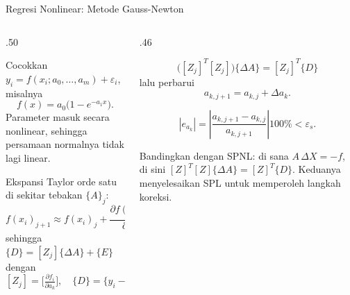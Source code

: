 \documentclass[aspectratio=169,10pt]{beamer}
\begin{document}
\begin{frame}{Regresi Nonlinear: Metode Gauss-Newton}
\tiny
\begin{columns}[T,totalwidth=\textwidth]
\begin{column}{.50\textwidth}
\begin{bluebox}[Masalah]
Cocokkan $y_i=f(x_i;a_0,\dots,a_m)+\varepsilon_i$, misalnya
\[
f(x)=a_0\big(1-e^{-a_1x}\big).
\]
Parameter masuk secara nonlinear, sehingga persamaan normalnya tidak lagi linear.
\end{bluebox}
\begin{orangebox}
Ekspansi Taylor orde satu di sekitar tebakan $\{A\}_j$:
\[
f(x_i)_{j+1}\approx f(x_i)_j+\frac{\partial f(x_i)_j}{\partial a_0}\Delta a_0+\frac{\partial f(x_i)_j}{\partial a_1}\Delta a_1,
\]
sehingga $\{D\}=[Z_j]\{\Delta A\}+\{E\}$ dengan
\[
[Z_j]=\Big[\tfrac{\partial f_i}{\partial a_k}\Big],\quad
\{D\}=\big\{y_i-f(x_i)_j\big\}.
\]
\end{orangebox}
\end{column}
\begin{column}{.46\textwidth}
\begin{greenbox}
\[
\big([Z_j]^T[Z_j]\big)\{\Delta A\}=[Z_j]^T\{D\}
\]
lalu perbarui
\[
a_{k,j+1}=a_{k,j}+\Delta a_k .
\]
\end{greenbox}
\begin{purplebox}
\[
|e_{a_k}|=\left|\frac{a_{k,j+1}-a_{k,j}}{a_{k,j+1}}\right|100\%<\varepsilon_s .
\]
\end{purplebox}
\begin{goldbox}
Bandingkan dengan SPNL: di sana $A\,\Delta X=-f$, di sini $[Z]^T[Z]\{\Delta A\}=[Z]^T\{D\}$. Keduanya menyelesaikan SPL untuk memperoleh langkah koreksi.
\end{goldbox}
\end{column}
\end{columns}
\end{frame}
\end{document}
